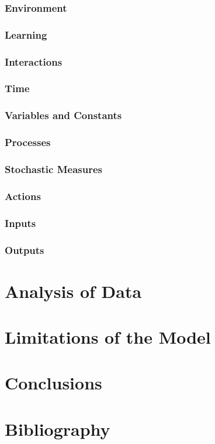 \documentclass[a4paper, 10pt]{article}
\begin{document}
\subsubsection* {Environment}
\subsubsection* {Learning}
\subsubsection* {Interactions}
\subsubsection* {Time}
\subsubsection* {Variables and Constants}
\subsubsection* {Processes}
\subsubsection* {Stochastic Measures}
\subsubsection* {Actions}
\subsubsection* {Inputs}
\subsubsection* {Outputs}

\section{Analysis of Data}
\section{Limitations of the Model}
\section{Conclusions}
\newpage
\section{Bibliography}
\end{document}
